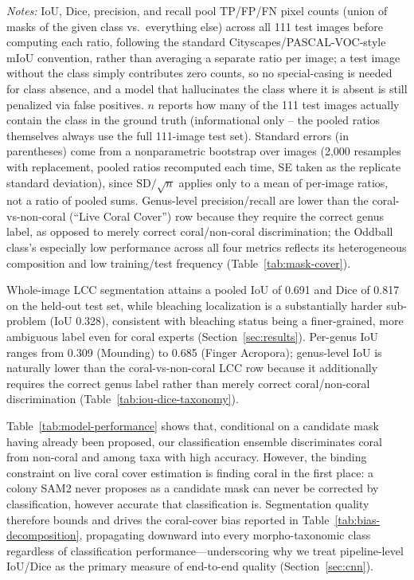\documentclass[11pt]{elsarticle}
\begin{document}
\begin{table}[htbp]
\begin{tablenotes}
\item \emph{Notes:} IoU, Dice, precision, and recall pool TP/FP/FN pixel counts (union of masks of the given class vs.\ everything else) across all 111 test images before computing each ratio, following the standard Cityscapes/PASCAL-VOC-style mIoU convention, rather than averaging a separate ratio per image; a test image without the class simply contributes zero counts, so no special-casing is needed for class absence, and a model that hallucinates the class where it is absent is still penalized via false positives. $n$ reports how many of the 111 test images actually contain the class in the ground truth (informational only -- the pooled ratios themselves always use the full 111-image test set). Standard errors (in parentheses) come from a nonparametric bootstrap over images (2,000 resamples with replacement, pooled ratios recomputed each time, SE taken as the replicate standard deviation), since $\mathrm{SD}/\!\sqrt{n}$ applies only to a mean of per-image ratios, not a ratio of pooled sums. Genus-level precision/recall are lower than the coral-vs-non-coral (``Live Coral Cover'') row because they require the correct genus label, as opposed to merely correct coral/non-coral discrimination; the Oddball class's especially low performance across all four metrics reflects its heterogeneous composition and low training/test frequency (Table~\ref{tab:mask-cover}).
\end{tablenotes}
\end{table}

Whole-image LCC segmentation attains a pooled IoU of 0.691 and Dice of 0.817 on the held-out test set, while bleaching localization is a substantially harder sub-problem (IoU 0.328), consistent with bleaching status being a finer-grained, more ambiguous label even for coral experts (Section~\ref{sec:results}). Per-genus IoU ranges from 0.309 (Mounding) to 0.685 (Finger Acropora); genus-level IoU is naturally lower than the coral-vs-non-coral LCC row because it additionally requires the correct genus label rather than merely correct coral/non-coral discrimination (Table~\ref{tab:iou-dice-taxonomy}).

Table~\ref{tab:model-performance} shows that, conditional on a candidate mask having already been proposed, our classification ensemble discriminates coral from non-coral and among taxa with high accuracy. However, the binding constraint on live coral cover estimation is finding coral in the first place: a colony SAM2 never proposes as a candidate mask can never be corrected by classification, however accurate that classification is. Segmentation quality therefore bounds and drives the coral-cover bias reported in Table~\ref{tab:bias-decomposition}, propagating downward into every morpho-taxonomic class regardless of classification performance---underscoring why we treat pipeline-level IoU/Dice as the primary measure of end-to-end quality (Section~\ref{sec:cnn}).
\end{document}
